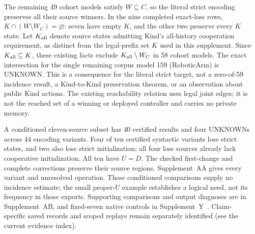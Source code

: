 The remaining 49 cohort models satisfy $W\subseteq C$, so the literal
strict encoding preserves all their source winners. In the nine
completed exact-loss rows, $K\cap(W\setminus W_C)=\varnothing$:
seven have empty $K$, and the other two preserve every $K$ state.
Let $K_{\rm all}$ denote source states admitting Kind's all-history
cooperation requirement, as distinct from the legal-prefix set $K$ used
in this supplement. Since $K_{\rm all}\subseteq K$, these existing facts
exclude $K_{\rm all}\setminus W_C$ in 58 cohort models. The exact
intersection for the single remaining corpus model 159 (RoboticArm) is UNKNOWN.
This is a consequence for the literal strict target, not a zero-of-59
incidence result, a Kind-to-Kind preservation theorem, or an observation
about public Kind actions. The existing reachability relation uses legal
joint edges; it is not the reached set of a winning or deployed
controller and carries no private memory.

A conditioned eleven-source subset has 40 certified results and four
UNKNOWNs across 44 encoding variants. Four of ten certified syntactic
variants lose strict states, and two also lose strict initialization;
all four loss sources already lack cooperative initialization. All ten have
$U=D$. The checked first-change and complete corrections preserve
their source regions. Supplement~AA gives every variant and unresolved
operation. These conditioned comparisons supply no incidence estimate;
the small proper-$U$ example establishes a logical need, not its
frequency in those exports. Supporting comparisons and output diagnoses
are in Supplement~AB, and fixed-seven native controls in
Supplement~Y~\cite{fixedsevennative2026}. Claim-specific saved records and
scoped replays remain separately identified (see the current evidence index).

